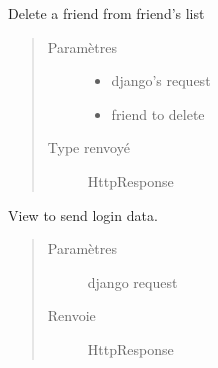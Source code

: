 \documentclass[letterpaper,10pt,french]{sphinxmanual}
\begin{document}
\begin{fulllineitems}
\label{\detokenize{accounts:accounts.views.delete_friend}}
Delete a friend from friend’s list
\begin{quote}\begin{description}
\item[{Paramètres}] \leavevmode\begin{itemize}
\item {}
 \textendash{} django’s request

\item {}
 \textendash{} friend to delete

\end{itemize}

\item[{Type renvoyé}] \leavevmode
HttpResponse

\end{description}\end{quote}

\end{fulllineitems}


\begin{fulllineitems}
\label{\detokenize{accounts:accounts.views.get_user_info}}
View to send login data.
\begin{quote}\begin{description}
\item[{Paramètres}] \leavevmode
{} \textendash{} django request

\item[{Renvoie}] \leavevmode
HttpResponse

\end{description}\end{quote}

\end{fulllineitems}
\end{document}
